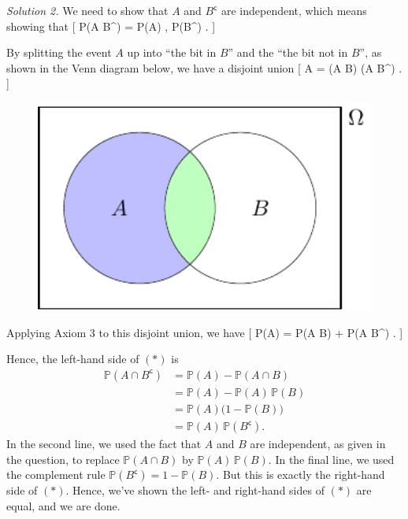 \documentclass[
  letterpaper,
  DIV=11,
  numbers=noendperiod]{scrreprt}
\theoremstyle{remark}
\begin{document}
\emph{Solution 2.} We need to show that \(A\) and \(B^\mathsf{c}\) are
independent, which means showing that {[} \mathbb P(A
\cap B\^{}) = \mathbb P(A) , \mathbb P(B\^{}) .
\tag{$*$} {]}

By splitting the event \(A\) up into ``the bit in \(B\)'' and the ``the
bit not in \(B\)'', as shown in the Venn diagram below, we have a
disjoint union {[} A = (A \cap B) \cup (A \cap B\^{}) . {]}

\begin{figure}

{\centering \includegraphics[width=4.44444in,height=\textheight]{./writing_files/figure-pdf/writing-pic-1-1.pdf}

}

\end{figure}

Applying Axiom 3 to this disjoint union, we have {[} \mathbb P(A) =
\mathbb P(A \cap B) + \mathbb P(A \cap B\^{}) . {]}

Hence, the left-hand side of \((*)\) is \begin{align*}
\mathbb P(A \cap B^\mathsf{c})
&= \mathbb P(A) - \mathbb P(A \cap B) \\
&= \mathbb P(A) - \mathbb P(A)\,\mathbb P(B) \\
&= \mathbb P(A) \big(1 - \mathbb P(B)\big) \\
&= \mathbb P(A) \, \mathbb P(B^\mathsf{c}) .
\end{align*} In the second line, we used the fact that \(A\) and \(B\)
are independent, as given in the question, to replace
\(\mathbb P(A \cap B)\) by \(\mathbb P(A)\,\mathbb P(B)\). In the final
line, we used the complement rule
\(\mathbb P(B^\mathsf{c}) = 1 - \mathbb P(B)\). But this is exactly the
right-hand side of \((*)\). Hence, we've shown the left- and right-hand
sides of \((*)\) are equal, and we are done.
\end{document}
